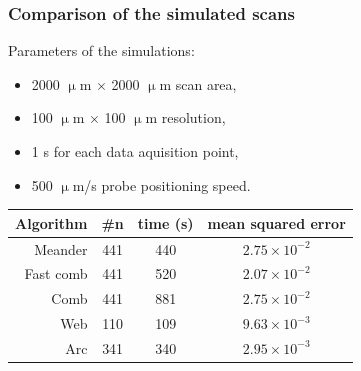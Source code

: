 \documentclass{beamer}
\begin{document}
\begin{frame}
	\frametitle{Comparison of the simulated scans}
Parameters of the simulations:\\
\begin{itemize}
\item 2000 $\upmu$m $\times$ 2000 $\upmu$m scan area,
\item 100 $\upmu$m $\times$ 100 $\upmu$m resolution,
\item 1 s for each data aquisition point,
\item 500 $\upmu$m/s probe positioning speed.
\end{itemize}

\vfill
\begin{table}
		\label{table:comp}
		\centering
		\begin{tabular}{r c c c}
			Algorithm & \#n & time (s) & mean squared error \\
			\hline
			Meander & 441 & 440 & $2.75\times 10^{-2}$ \\
			Fast comb& 441 & 520  & $2.07\times 10^{-2}$ \\
			Comb & 441 & 881 & $2.75\times 10^{-2}$ \\
			Web & 110 & 109 & $9.63\times 10^{-3}$ \\
			Arc & 341 & 340 & $2.95\times 10^{-3}$ \\
		\end{tabular}
\end{table}
\end{frame}
\end{document}
